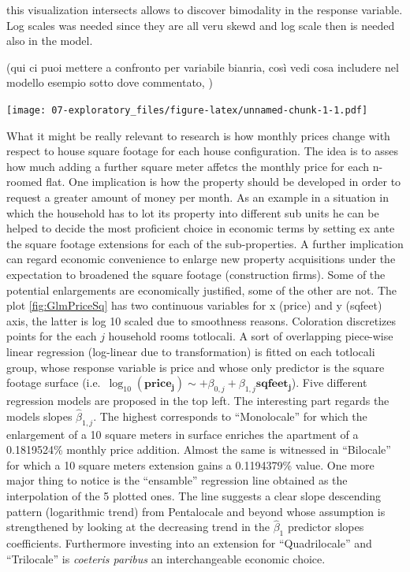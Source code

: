 \documentclass[
  12pt,
  a4paper,
  oneside]{book}
\theoremstyle{definition}
\theoremstyle{definition}
\theoremstyle{definition}
\theoremstyle{remark}
\begin{document}
this visualization intersects allows to discover bimodality in the response variable. Log scales was needed since they are all veru skewd and log scale then is needed also in the model.

(qui ci puoi mettere a confronto per variabile bianria, così vedi cosa includere nel modello esempio sotto dove commentato, )

\texttt{[image: 07-exploratory\_files/figure-latex/unnamed-chunk-1-1.pdf]}

What it might be really relevant to research is how monthly prices change with respect to house square footage for each house configuration. The idea is to asses how much adding a further square meter affetcs the monthly price for each n-roomed flat.
One implication is how the property should be developed in order to request a greater amount of money per month. As an example in a situation in which the household has to lot its property into different sub units he can be helped to decide the most proficient choice in economic terms by setting ex ante the square footage extensions for each of the sub-properties.
A further implication can regard economic convenience to enlarge new property acquisitions under the expectation to broadened the square footage (construction firms). Some of the potential enlargements are economically justified, some of the other are not.
The plot \ref{fig:GlmPriceSq} has two continuous variables for x (price) and y (sqfeet) axis, the latter is log 10 scaled due to smoothness reasons. Coloration discretizes points for the each \(j\) household rooms totlocali. A sort of overlapping piece-wise linear regression (log-linear due to transformation) is fitted on each totlocali group, whose response variable is price and whose only predictor is the square footage surface (i.e.~\(\log_{10}(\mathbf{price_j}) \sim +\beta_{0,j}+\beta_{1,j}\mathbf{sqfeet_j}\)). Five different regression models are proposed in the top left. The interesting part regards the models slopes \(\hat\beta_{1,j}\). The highest corresponds to ``Monolocale'' for which the enlargement of a 10 square meters in surface enriches the apartment of a 0.1819524\% monthly price addition. Almost the same is witnessed in ``Bilocale'' for which a 10 square meters extension gains a 0.1194379\% value. One more major thing to notice is the ``ensamble'' regression line obtained as the interpolation of the 5 plotted ones. The line suggests a clear slope descending pattern (logarithmic trend) from Pentalocale and beyond whose assumption is strengthened by looking at the decreasing trend in the \(\hat\beta_1\) predictor slopes coefficients. Furthermore investing into an extension for ``Quadrilocale'' and ``Trilocale'' is \emph{coeteris paribus} an interchangeable economic choice.
\end{document}
